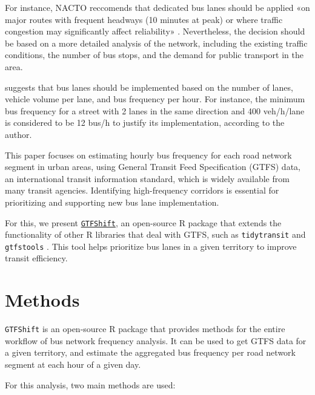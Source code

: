\documentclass[
]{article}
\begin{document}
For instance, NACTO reccomends that dedicated bus lanes should be applied «on major routes with frequent headways (10 minutes at peak) or where traffic congestion may significantly affect reliability» \citep{nacto2016transit}.
Nevertheless, the decision should be based on a more detailed analysis of the network, including the existing traffic conditions, the number of bus stops, and the demand for public transport in the area.

\citet{vuchic1981} suggests that bus lanes should be implemented based on the number of lanes, vehicle volume per lane, and bus frequency per hour. For instance, the minimum bus frequency for a street with 2 lanes in the same direction and 400 veh/h/lane is considered to be 12 bus/h to justify its implementation, according to the author.

This paper focuses on estimating hourly bus frequency for each road network segment in urban areas, using General Transit Feed Specification (GTFS) data, an international transit information standard, which is widely available from many transit agencies.
Identifying high-frequency corridors is essential for prioritizing and supporting new bus lane implementation.

For this, we present \href{https://u-shift.github.io/GTFShift/}{\texttt{GTFShift}}, an open-source R package \citep{gshift2025} that extends the functionality of other R libraries that deal with GTFS, such as \texttt{tidytransit} \citep{tidytransit} and \texttt{gtfstools} \citep{gtfstools}.
This tool helps prioritize bus lanes in a given territory to improve transit efficiency.

\section{Methods}\label{methods}

\texttt{GTFShift} is an open-source R package that provides methods for the entire workflow of bus network frequency analysis.
It can be used to get GTFS data for a given territory, and estimate the aggregated bus frequency per road network segment at each hour of a given day.

For this analysis, two main methods are used:
\end{document}
